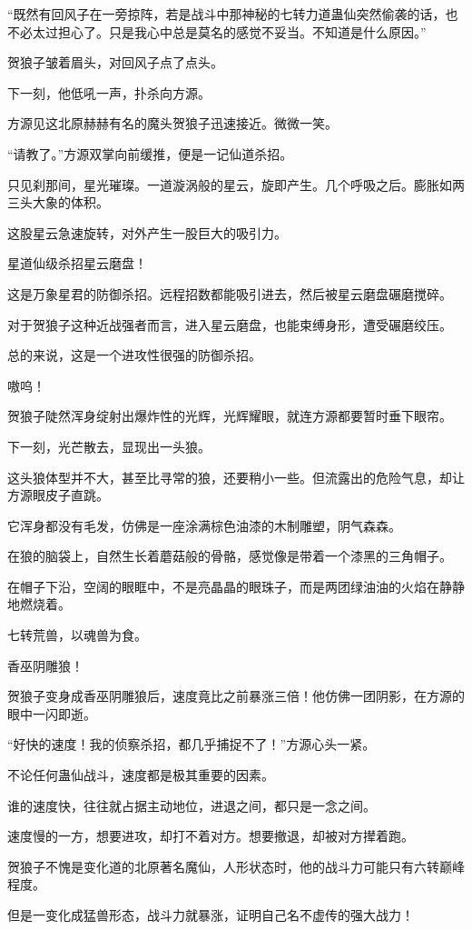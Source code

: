 \begin{this_body}
“既然有回风子在一旁掠阵，若是战斗中那神秘的七转力道蛊仙突然偷袭的话，也不必太过担心了。只是我心中总是莫名的感觉不妥当。不知道是什么原因。”

贺狼子皱着眉头，对回风子点了点头。

下一刻，他低吼一声，扑杀向方源。

方源见这北原赫赫有名的魔头贺狼子迅速接近。微微一笑。

“请教了。”方源双掌向前缓推，便是一记仙道杀招。

只见刹那间，星光璀璨。一道漩涡般的星云，旋即产生。几个呼吸之后。膨胀如两三头大象的体积。

这股星云急速旋转，对外产生一股巨大的吸引力。

星道仙级杀招星云磨盘！

这是万象星君的防御杀招。远程招数都能吸引进去，然后被星云磨盘碾磨搅碎。

对于贺狼子这种近战强者而言，进入星云磨盘，也能束缚身形，遭受碾磨绞压。

总的来说，这是一个进攻性很强的防御杀招。

嗷呜！

贺狼子陡然浑身绽射出爆炸性的光辉，光辉耀眼，就连方源都要暂时垂下眼帘。

下一刻，光芒散去，显现出一头狼。

这头狼体型并不大，甚至比寻常的狼，还要稍小一些。但流露出的危险气息，却让方源眼皮子直跳。

它浑身都没有毛发，仿佛是一座涂满棕色油漆的木制雕塑，阴气森森。

在狼的脑袋上，自然生长着蘑菇般的骨骼，感觉像是带着一个漆黑的三角帽子。

在帽子下沿，空阔的眼眶中，不是亮晶晶的眼珠子，而是两团绿油油的火焰在静静地燃烧着。

七转荒兽，以魂兽为食。

香巫阴雕狼！

贺狼子变身成香巫阴雕狼后，速度竟比之前暴涨三倍！他仿佛一团阴影，在方源的眼中一闪即逝。

“好快的速度！我的侦察杀招，都几乎捕捉不了！”方源心头一紧。

不论任何蛊仙战斗，速度都是极其重要的因素。

谁的速度快，往往就占据主动地位，进退之间，都只是一念之间。

速度慢的一方，想要进攻，却打不着对方。想要撤退，却被对方撵着跑。

贺狼子不愧是变化道的北原著名魔仙，人形状态时，他的战斗力可能只有六转巅峰程度。

但是一变化成猛兽形态，战斗力就暴涨，证明自己名不虚传的强大战力！


\end{this_body}
